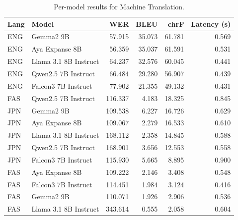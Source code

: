 \begin{table}[t]
\centering
\caption{Per-model results for Machine Translation.}
\label{tab:appendix-machine-translation-analysis}
\begin{tabular}{llrrrr}
\toprule
Lang & Model & WER & BLEU & chrF & Latency (s) \\
\midrule
ENG & Gemma2 9B & 57.915 & 35.073 & 61.781 & 0.569 \\
ENG & Aya Expanse 8B & 56.359 & 35.037 & 61.591 & 0.531 \\
ENG & Llama 3.1 8B Instruct & 64.237 & 32.576 & 60.045 & 0.441 \\
ENG & Qwen2.5 7B Instruct & 66.484 & 29.280 & 56.907 & 0.439 \\
ENG & Falcon3 7B Instruct & 77.902 & 21.355 & 49.132 & 0.431 \\
FAS & Qwen2.5 7B Instruct & 116.337 & 4.183 & 18.325 & 0.845 \\
JPN & Gemma2 9B & 109.538 & 6.227 & 16.726 & 0.629 \\
JPN & Aya Expanse 8B & 109.067 & 2.279 & 16.533 & 0.610 \\
JPN & Llama 3.1 8B Instruct & 168.112 & 2.358 & 14.845 & 0.588 \\
JPN & Qwen2.5 7B Instruct & 168.901 & 3.656 & 12.553 & 0.558 \\
JPN & Falcon3 7B Instruct & 115.930 & 5.665 & 8.895 & 0.900 \\
FAS & Aya Expanse 8B & 109.222 & 2.146 & 3.408 & 0.548 \\
FAS & Falcon3 7B Instruct & 114.451 & 1.984 & 3.124 & 0.416 \\
FAS & Gemma2 9B & 110.071 & 1.926 & 2.906 & 0.536 \\
FAS & Llama 3.1 8B Instruct & 343.614 & 0.555 & 2.058 & 0.604 \\
\bottomrule
\end{tabular}
\end{table}
